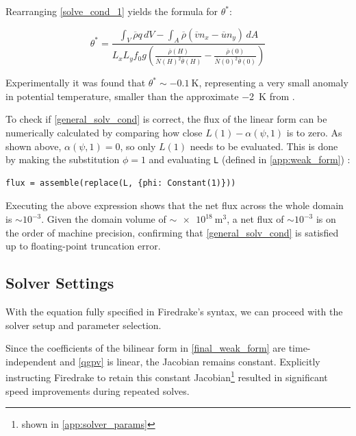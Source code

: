 \documentclass{article}
\begin{document}
Rearranging \cref{solve_cond_1} yields the formula for $\theta^*$:

\begin{equation}\label{general_solv_cond}
    \theta^* = \frac{\displaystyle \int_V { \overline\rho q  \,dV} - \int_A {\overline \rho \left( \overline v n_x - \overline u n_y\right)\,dA}}{ \displaystyle L_x L_y f_0 g \left(\frac{\overline \rho (H)}{\overline N(H)^2 \overline \theta(H) } - \frac{\overline \rho (0)}{\overline N(0)^2 \overline \theta(0) }\right)}
\end{equation}

Experimentally it was found that $\theta^* \sim \qty{-0.1}{\kelvin}$, representing a very small anomaly in potential temperature, smaller than the approximate \qty{-2}{\kelvin} from \cite{sprenger2007userguide}.

To check if \cref{general_solv_cond} is correct, the flux of the linear form can be numerically calculated by comparing how close $L(1)-\alpha(\psi, 1)$ is to zero.
As shown above, $\alpha(\psi, 1)=0$, so only $L(1)$ needs to be evaluated.
This is done by making the substitution $\phi = 1$ and evaluating \texttt{L} (defined in \cref{app:weak_form}) \cite{UFL}:

\begin{verbatim}
flux = assemble(replace(L, {phi: Constant(1)}))
\end{verbatim}

Executing the above expression shows that the net flux across the whole domain is $\sim 10^{-3}$. Given the domain volume of $\sim \qty{e18}{\meter \cubed}$, a net flux of $\sim 10^{-3}$ is on the order of machine precision, confirming that \cref{general_solv_cond} is satisfied up to floating-point truncation error.

\subsection{Solver Settings}\label{sec:solver_settings}

With the equation fully specified in Firedrake's syntax, we can proceed with the solver setup and parameter selection.

Since the coefficients of the bilinear form in \cref{final_weak_form} are time-independent and \cref{qgpv} is linear, the Jacobian remains constant.
Explicitly instructing Firedrake to retain this constant Jacobian\footnote{shown in \cref{app:solver_params}} resulted in significant speed improvements during repeated solves.
\end{document}
